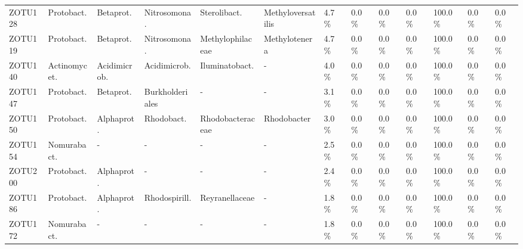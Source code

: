 \begin{table}
\begin{adjustbox}{max width=0.7\textwidth, max totalheight=0.85\textheight, keepaspectratio}
\begin{tabular}{llllllllll||lll}
ZOTU128 & Protobact.     & Betaprot.      & Nitrosomona.   & Sterolibact. & Methyloversatilis & \SI{4.7}{\percent}   & \SI{0.0}{\percent}  & \SI{0.0}{\percent}  & \SI{0.0}{\percent}  & \SI{100.0}{\percent} & \SI{0.0}{\percent}  & \SI{0.0}{\percent} \\
ZOTU119 & Protobact.     & Betaprot.      & Nitrosomona.   & Methylophilaceae & Methylotenera & \SI{4.7}{\percent}   & \SI{0.0}{\percent}  & \SI{0.0}{\percent}  & \SI{0.0}{\percent}  & \SI{100.0}{\percent} & \SI{0.0}{\percent}  & \SI{0.0}{\percent} \\
ZOTU140 & Actinomycet.   & Acidimicrob.   & Acidimicrob.   & Iluminatobact.   & -            & \SI{4.0}{\percent}   & \SI{0.0}{\percent}  & \SI{0.0}{\percent}  & \SI{0.0}{\percent}  & \SI{100.0}{\percent} & \SI{0.0}{\percent}  & \SI{0.0}{\percent} \\
ZOTU147 & Protobact.     & Betaprot.      & Burkholderiales & -                & -            & \SI{3.1}{\percent}   & \SI{0.0}{\percent}  & \SI{0.0}{\percent}  & \SI{0.0}{\percent}  & \SI{100.0}{\percent} & \SI{0.0}{\percent}  & \SI{0.0}{\percent} \\
ZOTU150 & Protobact.     & Alphaprot.     & Rhodobact.     & Rhodobacteraceae & Rhodobacter  & \SI{3.0}{\percent}   & \SI{0.0}{\percent}  & \SI{0.0}{\percent}  & \SI{0.0}{\percent}  & \SI{100.0}{\percent} & \SI{0.0}{\percent}  & \SI{0.0}{\percent} \\
ZOTU154 & Nomurabact.    & -              & -              & -                & -            & \SI{2.5}{\percent}   & \SI{0.0}{\percent}  & \SI{0.0}{\percent}  & \SI{0.0}{\percent}  & \SI{100.0}{\percent} & \SI{0.0}{\percent}  & \SI{0.0}{\percent} \\
ZOTU200 & Protobact.     & Alphaprot.     & -              & -                & -            & \SI{2.4}{\percent}   & \SI{0.0}{\percent}  & \SI{0.0}{\percent}  & \SI{0.0}{\percent}  & \SI{100.0}{\percent} & \SI{0.0}{\percent}  & \SI{0.0}{\percent} \\
ZOTU186 & Protobact.     & Alphaprot.     & Rhodospirill.  & Reyranellaceae   & -            & \SI{1.8}{\percent}   & \SI{0.0}{\percent}  & \SI{0.0}{\percent}  & \SI{0.0}{\percent}  & \SI{100.0}{\percent} & \SI{0.0}{\percent}  & \SI{0.0}{\percent} \\
ZOTU172 & Nomurabact.    & -              & -              & -                & -            & \SI{1.8}{\percent}   & \SI{0.0}{\percent}  & \SI{0.0}{\percent}  & \SI{0.0}{\percent}  & \SI{100.0}{\percent} & \SI{0.0}{\percent}  & \SI{0.0}{\percent} \\

\end{tabular}
\end{adjustbox}
\end{table}
